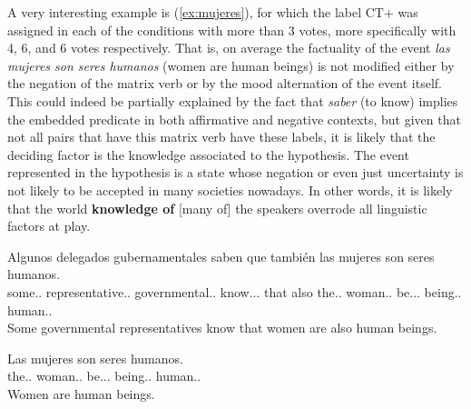 A very interesting example is (\ref{ex:mujeres}), for which the label CT+ was assigned in each of the conditions with more than 3 votes, more specifically with 4, 6, and 6 votes respectively. That is, on average the factuality of the event \textit{las mujeres son seres humanos} (women are human beings) is not modified either by the negation of the matrix verb or by the mood alternation of the event itself. This could indeed be partially explained by the fact that \textit{saber} (to know) implies the embedded predicate in both affirmative and negative contexts, but given that not all pairs that have this matrix verb have these labels, it is likely that the deciding factor is the knowledge associated to the hypothesis. The event represented in the hypothesis is a state whose negation or even just uncertainty is not likely to be accepted in many societies nowadays. In other words, it is likely that the world \textbf{knowledge of} [many of]  the speakers overrode all linguistic factors at play.\\

\begin{exe}
  \ex\label{ex:mujeres}
    \begin{xlist}
      \item{\gll Algunos delegados gubernamentales saben que también las mujeres son seres humanos.\\ some.\M.\Pl{} representative.\M.\Pl{} governmental.\M.\Pl{} know.\Prs.\Ind.\Tsg{} that also the.\F.\Pl{} woman.\F.\Pl{} be.\Prs.\Ind.\Tpl{} being.\M.\Pl{} human.\M.\Pl{} \\\glt Some governmental representatives know that women are also human beings.}
      \item{\gll Las mujeres son seres humanos.\\ the.\F.\Pl{} woman.\F.\Pl{} be.\Prs.\Ind.\Tpl{} being.\M.\Pl{} human.\M.\Pl{} \\\glt Women are human beings.} \label{ex:hypmujeres}
    \end{xlist}
\end{exe}

